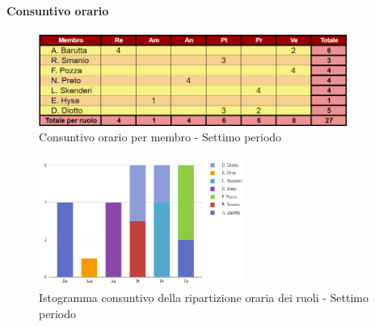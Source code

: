 \pagebreak

\paragraph{Consuntivo orario}

\begin{figure}[H]
    \centering
    \includegraphics[width=0.9\textwidth]{../Images/consuntivoOrario7Periodo.png}
    \caption{Consuntivo orario per membro - Settimo periodo}
    \label{fig:Constuntivo_orario_7}
\end{figure}

\vspace{0.6cm}

\begin{figure}[H]
    \centering
    \includegraphics[width=0.6\textwidth]{../Images/consuntivoDivisioneRuoli7Periodo.png}
    \caption{Istogramma consuntivo della ripartizione oraria dei ruoli - Settimo periodo}
    \label{fig:Consuntivo_ripartizione_oraria_7}
\end{figure}
